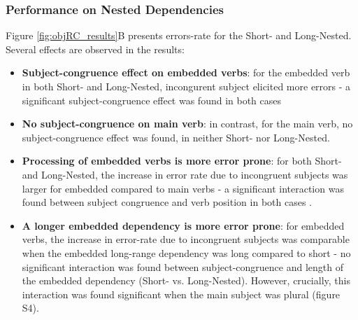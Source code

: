 \subsubsection{Performance on Nested Dependencies}
Figure \ref{fig:objRC_results}B presents errors-rate for the Short- and Long-Nested. Several effects are observed in the results: 
\begin{itemize}
    \item \textbf{Subject-congruence effect on embedded verbs}: for the embedded verb in both Short- and Long-Nested, incongurent subject elicited more errors - a significant subject-congruence effect was found in both cases 
    \item \textbf{No subject-congruence on main verb}: in contrast, for the main verb, no subject-congruence effect was found, in neither Short- nor Long-Nested. 
    \item \textbf{Processing of embedded verbs is more error prone}: for both Short- and Long-Nested, the increase in error rate due to incongruent subjects was larger for embedded compared to main verbs - a significant interaction was found between subject congruence and verb position in both cases .
    \item \textbf{A longer embedded dependency is more error prone}: for embedded verbs, the increase in error-rate due to incongruent subjects was comparable when the embedded long-range dependency was long compared to short - no significant interaction was found between subject-congruence and length of the embedded dependency (Short- vs. Long-Nested). However, crucially, this interaction was found significant when the main subject was plural (figure S4). 
\end{itemize}

    

  
